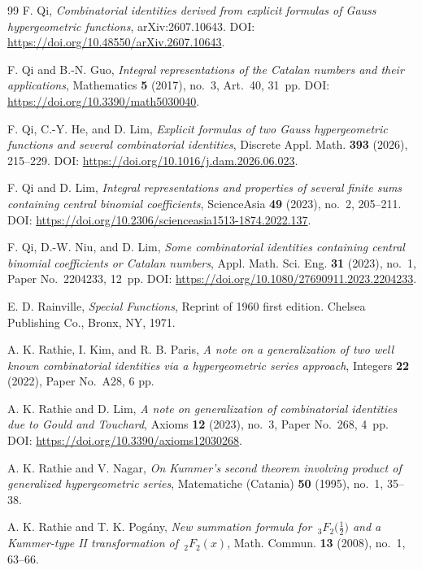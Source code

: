 \documentclass[reqno]{amsart}
\numberwithin{equation}{section}
\theoremstyle{plain}
\theoremstyle{remark}
\begin{document}
\begin{thebibliography}{99}
F. Qi, \textit{Combinatorial identities derived from explicit formulas of Gauss hypergeometric functions}, arXiv:2607.10643. DOI: \url{https://doi.org/10.48550/arXiv.2607.10643}.

F. Qi and B.-N. Guo, \textit{Integral representations of the Catalan numbers and their applications}, Mathematics \textbf{5} (2017), no.~3, Art.~40, 31~pp. DOI: \url{https://doi.org/10.3390/math5030040}.

F. Qi, C.-Y. He, and D. Lim, \textit{Explicit formulas of two Gauss hypergeometric functions and several combinatorial identities}, Discrete Appl. Math. \textbf{393} (2026), 215\nobreakdash--229. DOI: \url{https://doi.org/10.1016/j.dam.2026.06.023}.

F. Qi and D. Lim, \textit{Integral representations and properties of several finite sums containing central binomial coefficients}, ScienceAsia \textbf{49} (2023), no.~2, 205\nobreakdash--211. DOI: \url{https://doi.org/10.2306/scienceasia1513-1874.2022.137}.

F. Qi, D.-W. Niu, and D. Lim, \textit{Some combinatorial identities containing central binomial coefficients or Catalan numbers}, Appl. Math. Sci. Eng. \textbf{31} (2023), no.~1, Paper No.~2204233, 12~pp. DOI: \url{https://doi.org/10.1080/27690911.2023.2204233}.

E. D. Rainville, \textit{Special Functions}, Reprint of 1960 first edition. Chelsea Publishing Co., Bronx, NY, 1971.

A. K. Rathie, I. Kim, and R. B. Paris, \textit{A note on a generalization of two well known combinatorial identities via a hypergeometric series approach}, Integers \textbf{22} (2022), Paper No.~A28, 6 pp.

A. K. Rathie and D. Lim, \textit{A note on generalization of combinatorial identities due to Gould and Touchard}, Axioms \textbf{12} (2023), no.~3, Paper No.~268, 4~pp. DOI: \url{https://doi.org/10.3390/axioms12030268}.

A. K. Rathie and V. Nagar, \textit{On Kummer's second theorem involving product of generalized hypergeometric series}, Matematiche (Catania) \textbf{50} (1995), no.~1, 35\nobreakdash--38.

A. K. Rathie and T. K. Pog\'any, \textit{New summation formula for ${\,}_3F_2\bigl(\frac12\bigr)$ and a Kummer-type II transformation of ${\,}_2F_2(x)$}, Math. Commun. \textbf{13} (2008), no.~1, 63\nobreakdash--66.


\end{thebibliography}
\end{document}
